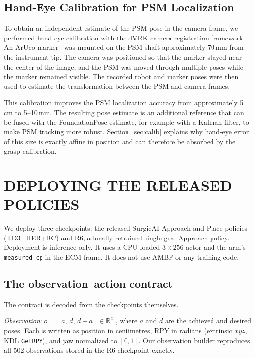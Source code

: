 \documentclass[letterpaper, 10 pt, conference]{ieeeconf}  %
\begin{document}
\subsection{Hand-Eye Calibration for PSM Localization}
To obtain an independent estimate of the PSM pose in the camera frame, we
performed hand-eye calibration with the dVRK camera registration framework. An
ArUco marker~\cite{garrido2014aruco} was mounted on the PSM shaft approximately
70\,mm from the instrument tip. The camera was positioned so that the marker
stayed near the center of the image, and the PSM was moved through multiple
poses while the marker remained visible. The recorded robot and marker poses
were then used to estimate the transformation between the PSM and camera frames.

This calibration improves the PSM localization accuracy from approximately 5\,cm
to 5--10\,mm. The resulting pose estimate is an additional reference that can
be fused with the FoundationPose estimate, for example with a Kalman filter, to
make PSM tracking more robust. Section~\ref{sec:calib} explains why hand-eye
error of this size is exactly affine in position and can therefore be absorbed
by the grasp calibration.


\section{DEPLOYING THE RELEASED POLICIES}
\label{sec:deploy}

We deploy three checkpoints: the released SurgicAI Approach and Place policies
(TD3+HER+BC) and R6, a locally retrained single-goal Approach policy. Deployment
is inference-only. It uses a CPU-loaded $3{\times}256$ actor and the arm's
\texttt{measured\_cp} in the ECM frame. It does not use AMBF or any training code.

\subsection{The observation--action contract}
The contract is decoded from the checkpoints themselves.

\emph{Observation}: $o=[a,\,d,\,d{-}a]\in\mathbb{R}^{21}$, where $a$ and $d$ are
the achieved and desired poses. Each is written as position in centimetres,
RPY in radians (extrinsic $xyz$, KDL \texttt{GetRPY}), and jaw normalized to
$[0,1]$. Our observation builder reproduces all 502 observations stored in the
R6 checkpoint exactly.
\end{document}

